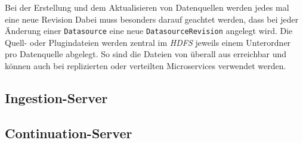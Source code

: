 Bei der Erstellung und dem Aktualisieren von Datenquellen werden jedes mal eine neue Revision 
Dabei muss besonders darauf geachtet werden, dass bei jeder Änderung einer \verb|Datasource| eine neue \verb|DatasourceRevision| angelegt wird.
Die Quell- oder Plugindateien werden zentral im \textit{HDFS} jeweils einem Unterordner pro Datenquelle abgelegt.
So sind die Dateien von überall aus erreichbar und können auch bei replizierten oder verteilten Microservices verwendet werden.


\subsection{Ingestion-Server}



\subsection{Continuation-Server}